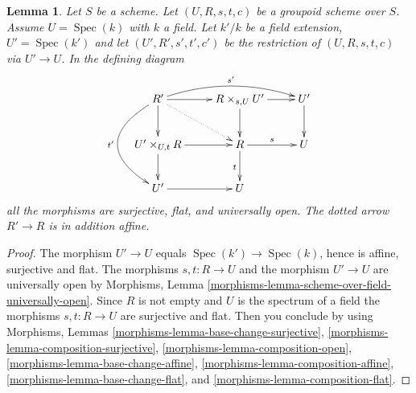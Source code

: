\documentclass{stacks-project}
\theoremstyle{plain}
\newtheorem{lemma}[subsection]{Lemma}
\theoremstyle{definition}
\theoremstyle{remark}
\numberwithin{equation}{subsection}
\def\Spec{\mathop{\mathrm{Spec}}}
\begin{document}
\begin{lemma}
\label{lemma-restrict-groupoid-on-field}
Let $S$ be a scheme. Let $(U, R, s, t, c)$ be a groupoid scheme
over $S$. Assume $U = \Spec(k)$ with $k$ a field.
Let $k'/k$ be a field extension, $U' = \Spec(k')$
and let $(U', R', s', t', c')$ be the restriction of
$(U, R, s, t, c)$ via $U' \to U$. In the defining diagram
$$
\xymatrix{
R' \ar[d] \ar[r] \ar@/_3pc/[dd]_{t'} \ar@/^1pc/[rr]^{s'} \ar@{..>}[rd] &
R \times_{s, U} U' \ar[r] \ar[d] &
U' \ar[d] \\
U' \times_{U, t} R \ar[d] \ar[r] &
R \ar[r]^s \ar[d]_t &
U \\
U' \ar[r] &
U
}
$$
all the morphisms are surjective, flat, and universally open.
The dotted arrow $R' \to R$ is in addition affine.
\end{lemma}

\begin{proof}
The morphism $U' \to U$ equals $\Spec(k') \to \Spec(k)$,
hence is affine, surjective and flat. The morphisms $s, t : R \to U$
and the morphism $U' \to U$ are universally open by
Morphisms, Lemma \ref{morphisms-lemma-scheme-over-field-universally-open}.
Since $R$ is not empty and $U$ is the spectrum of a field the morphisms
$s, t : R \to U$ are surjective and flat. Then you conclude by using
Morphisms, Lemmas \ref{morphisms-lemma-base-change-surjective},
\ref{morphisms-lemma-composition-surjective},
\ref{morphisms-lemma-composition-open},
\ref{morphisms-lemma-base-change-affine},
\ref{morphisms-lemma-composition-affine},
\ref{morphisms-lemma-base-change-flat}, and
\ref{morphisms-lemma-composition-flat}.
\end{proof}
\end{document}
